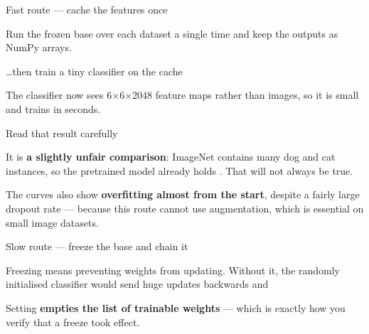 \documentclass[aspectratio=169,11pt,t]{beamer}
\begin{document}
\begin{frame}[shrink=25]{Fast route --- cache the features once}
{\fontsize{9.4}{12.6}\selectfont\color{fg2}Run the frozen base over each dataset a single time and keep the outputs as NumPy arrays.\par}\vskip 4pt
\end{frame}

\begin{frame}[shrink=25]{\ldots{}then train a tiny classifier on the cache}
{\fontsize{9.4}{12.6}\selectfont\color{fg2}The classifier now sees 6$\times$6$\times$2048 feature maps rather than images, so it is small and trains in seconds.\par}\vskip 4pt
\end{frame}

\begin{frame}[shrink=25]{Read that result carefully}
\begin{iband}[amber]
It is \textbf{a slightly unfair comparison}: ImageNet contains many dog and cat instances, so the pretrained model already holds . That will not always be true.
\end{iband}
{\fontsize{9.4}{12.6}\selectfont\color{fg2}The curves also show \textbf{overfitting almost from the start}, despite a fairly large dropout rate --- because this route cannot use augmentation, which is essential on small image datasets.\par}\vskip 4pt
\end{frame}

\begin{frame}[shrink=25]{Slow route --- freeze the base and chain it}
{\fontsize{9.4}{12.6}\selectfont\color{fg2}Freezing means preventing weights from updating. Without it, the randomly initialised classifier would send huge updates backwards and \par}\vskip 4pt
{\fontsize{9.4}{12.6}\selectfont\color{fg2}Setting  \textbf{empties the list of trainable weights} --- which is exactly how you verify that a freeze took effect.\par}\vskip 4pt
\end{frame}
\end{document}
